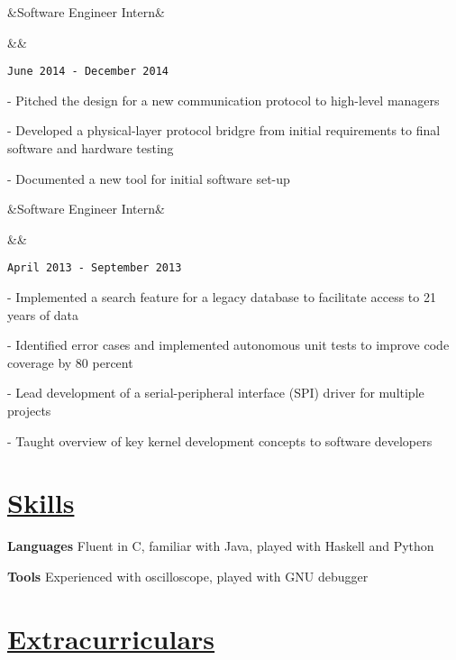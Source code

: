 \documentclass[11pt]{article}
\newcommand{\heading}[1]{
    \section*{\uline{\hfill #1}}
}
\newcommand{\squish}{
    \setlength{\itemsep}{0.5pt}
    \setlength{\parskip}{0pt}
    \setlength{\parsep}{0.5pt}
}
\newcommand{\when}[1]{
    \hfill \texttt{#1}
}
\newcommand{\experience}[4]{
    \ifx&#2&
        \item[{#1}]
    \else
        \ifx&#3&
            \item[{#1}, \emph{#2}]
        \else
            \item[{#1}, \emph{#2}, \small{#3}]
        \fi
    \fi
    \when{#4}
}
\newcommand{\skill}[2]{
    \textbf{#1} \hfill #2
}
\begin{document}
\begin{description}
\squish
\experience{Air-Weigh}
           {Software Engineer Intern}
           {}
           {June 2014 - December 2014}
 
	- Pitched the design for a new communication protocol to high-level managers

	- Developed a physical-layer protocol bridgre from initial requirements to final software and hardware testing

	- Documented a new tool for initial software set-up
  
\experience{Garmin AT}
           {Software Engineer Intern}
           {}
           {April 2013 - September 2013}
 
	- Implemented a search feature for a legacy database to facilitate access to 21 years of data

	- Identified error cases and implemented autonomous unit tests to improve code coverage by 80 percent

	- Lead development of a serial-peripheral interface (SPI) driver for multiple projects

	- Taught overview of key kernel development concepts to software developers
 
\end{description}


\heading{Skills}%

\skill{Languages}{Fluent in C, familiar with Java, played with Haskell and Python}

\skill{Tools}{Experienced with oscilloscope, played with GNU debugger}


\heading{Extracurriculars}%
\end{document}
